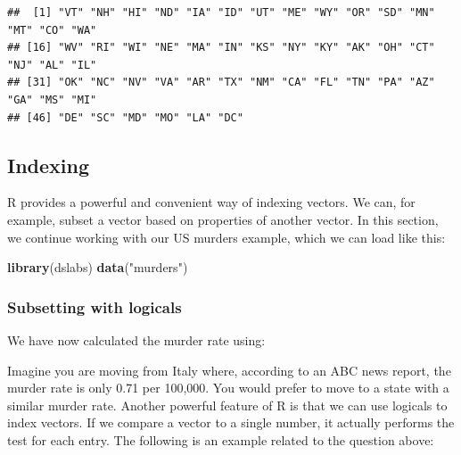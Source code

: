 \documentclass[
]{article}
\newenvironment{Shaded}{\begin{snugshade}}{\end{snugshade}}
\newcommand{\DecValTok}[1]{\textcolor[rgb]{0.00,0.00,0.81}{#1}}
\newcommand{\FunctionTok}[1]{\textcolor[rgb]{0.13,0.29,0.53}{\textbf{#1}}}
\newcommand{\NormalTok}[1]{#1}
\newcommand{\OtherTok}[1]{\textcolor[rgb]{0.56,0.35,0.01}{#1}}
\newcommand{\SpecialCharTok}[1]{\textcolor[rgb]{0.81,0.36,0.00}{\textbf{#1}}}
\newcommand{\StringTok}[1]{\textcolor[rgb]{0.31,0.60,0.02}{#1}}
\begin{document}
\begin{verbatim}
##  [1] "VT" "NH" "HI" "ND" "IA" "ID" "UT" "ME" "WY" "OR" "SD" "MN" "MT" "CO" "WA"
## [16] "WV" "RI" "WI" "NE" "MA" "IN" "KS" "NY" "KY" "AK" "OH" "CT" "NJ" "AL" "IL"
## [31] "OK" "NC" "NV" "VA" "AR" "TX" "NM" "CA" "FL" "TN" "PA" "AZ" "GA" "MS" "MI"
## [46] "DE" "SC" "MD" "MO" "LA" "DC"
\end{verbatim}

\subsection{Indexing}\label{indexing}

R provides a powerful and convenient way of indexing vectors. We can,
for example, subset a vector based on properties of another vector. In
this section, we continue working with our US murders example, which we
can load like this:

\begin{Shaded}
\begin{Highlighting}[]
\FunctionTok{library}\NormalTok{(dslabs)}
\FunctionTok{data}\NormalTok{(}\StringTok{"murders"}\NormalTok{)}
\end{Highlighting}
\end{Shaded}

\subsubsection{Subsetting with logicals}\label{subsetting-with-logicals}

We have now calculated the murder rate using:

\begin{Shaded}
\end{Shaded}

Imagine you are moving from Italy where, according to an ABC news
report, the murder rate is only 0.71 per 100,000. You would prefer to
move to a state with a similar murder rate. Another powerful feature of
R is that we can use logicals to index vectors. If we compare a vector
to a single number, it actually performs the test for each entry. The
following is an example related to the question above:
\end{document}
